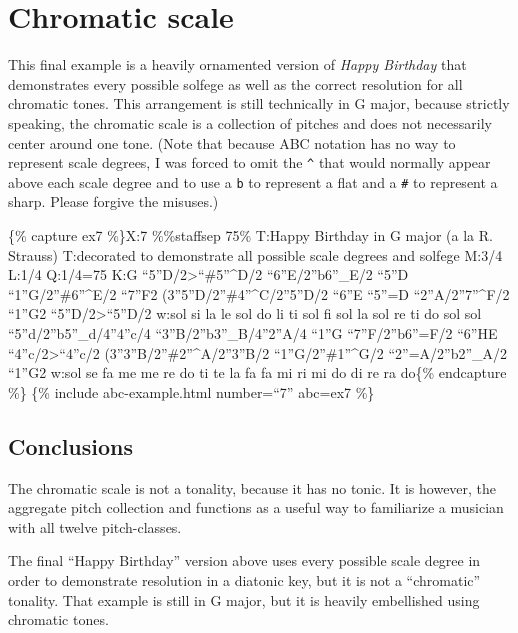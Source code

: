 \documentclass{book}
\begin{document}
\hypertarget{chromatic-scale}{%
\section{Chromatic scale}\label{chromatic-scale}}

This final example is a heavily ornamented version of \emph{Happy Birthday}
that demonstrates every possible solfege as well as the correct resolution for
all chromatic tones. This arrangement is still technically in G major, because
strictly speaking, the chromatic scale is a collection of pitches and does not
necessarily center around one tone. (Note that because ABC notation has no way
to represent scale degrees, I was forced to omit the \texttt{\^{}} that would
normally appear above each scale degree and to use a \texttt{b} to represent a
flat and a \texttt{\#} to represent a sharp. Please forgive the misuses.)

\{\% capture ex7 \%\}X:7 \%\%staffsep 75\% T:Happy Birthday in G major (a la
R. Strauss) T:decorated to demonstrate all possible scale degrees and solfege
M:3/4 L:1/4 Q:1/4=75 K:G ``5''D/2\textgreater{}``\#5''\^{}D/2\textbar{}
``6''E/2''b6''\_E/2 ``5''D ``1''G/2''\#6''\^{}E/2\textbar{} ``7''F2
(3''5''D/2''\#4''\^{}C/2''5''D/2\textbar{} ``6''E ``5''=D
``2''A/2''7''\^{}F/2\textbar{} ``1''G2
``5''D/2\textgreater{}``5''D/2\textbar{} w:sol si la le sol do li ti sol fi
sol la sol re ti do sol sol ``5''d/2''b5''\_d/4''4''c/4
``3''B/2''b3''\_B/4''2''A/4 ``1''G\textbar{} ``7''F/2''b6''=F/2 ``6''HE
``4''c/2\textgreater{}``4''c/2\textbar{} (3''3''B/2''\#2''\^{}A/2''3''B/2
``1''G/2''\#1''\^{}G/2 ``2''=A/2''b2''\_A/2\textbar{} ``1''G2\textbar{]} w:sol
se fa me me re do ti te la fa fa mi ri mi do di re ra do\{\% endcapture \%\}
\{\% include abc-example.html number=``7'' abc=ex7 \%\}

\hypertarget{conclusions-38}{%
\subsection{Conclusions}\label{conclusions-38}}

The chromatic scale is not a tonality, because it has no tonic. It is however,
the aggregate pitch collection and functions as a useful way to familiarize a
musician with all twelve pitch-classes.

The final ``Happy Birthday'' version above uses every possible scale degree in
order to demonstrate resolution in a diatonic key, but it is not a
``chromatic'' tonality. That example is still in G major, but it is heavily
embellished using chromatic tones.
\end{document}
